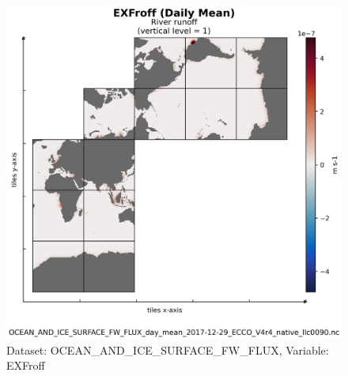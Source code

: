 \begin{figure}[H]
\centering
\includegraphics[scale=0.55]{../images/plots/native_plots/Ocean_and_Sea-Ice_Surface_Freshwater_Fluxes/EXFroff.png}
\caption{Dataset: OCEAN\_AND\_ICE\_SURFACE\_FW\_FLUX, Variable: EXFroff}
\label{tab:table-OCEAN_AND_ICE_SURFACE_FW_FLUX_EXFroff-Plot}
\end{figure}
\newpage
\pagebreak
